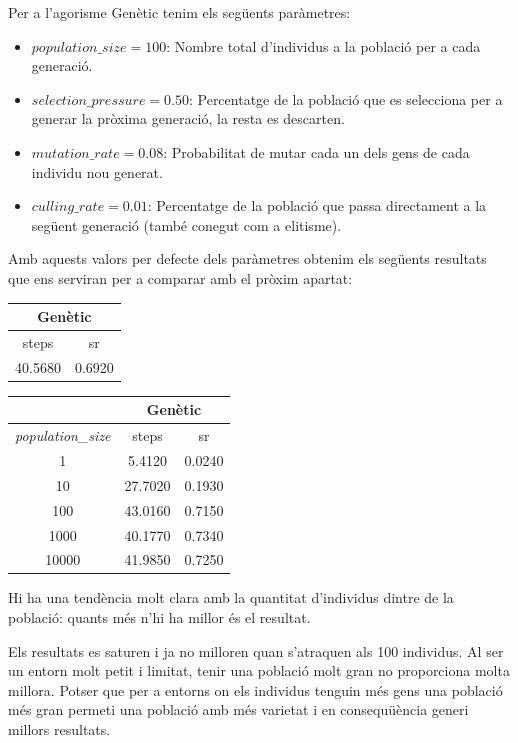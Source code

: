 \documentclass[12pt,a4paper]{report}
\begin{document}
Per a l'agorisme Genètic tenim els següents paràmetres:
\begin{itemize}
  \item $\mathit{population\_size} = 100$: Nombre total d'individus a la població per a cada generació.
  \item $\mathit{selection\_pressure} = 0.50$: Percentatge de la població que es selecciona per a generar
  la pròxima generació, la resta es descarten.
  \item $\mathit{mutation\_rate} = 0.08$: Probabilitat de mutar cada un dels gens de cada individu nou generat.
  \item $\mathit{culling\_rate} = 0.01$: Percentatge de la població que passa directament a la següent generació
  (també conegut com a elitisme).
\end{itemize}

Amb aquests valors per defecte dels paràmetres obtenim els següents resultats que ens serviran per a comparar
amb el pròxim apartat:

\begin{table}[H]
  \centering
  \begin{tabular}{| c c |}
    \hline
    \multicolumn{2}{|c|}{Genètic} \\
    \hline
    steps & sr \\
    \hline
    40.5680 & 0.6920 \\
    \hline
  \end{tabular}
\end{table}

\begin{minipage}{0.3\textwidth}
  \centering
  \begin{tabular}{| c | c c |}
    \hline
      & \multicolumn{2}{|c|}{Genètic} \\
    \hline
    \textit{population\_size} & steps & sr \\
    \hline
    1     &  5.4120 & 0.0240 \\
    10    & 27.7020 & 0.1930 \\
    100   & 43.0160 & 0.7150 \\
    1000  & 40.1770 & 0.7340 \\
    10000 & 41.9850 & 0.7250 \\
    \hline
  \end{tabular}
\end{minipage}
\hfill
\begin{minipage}{0.5\textwidth}
  Hi ha una tendència molt clara amb la quantitat d'individus dintre de la població: quants més n'hi ha
  millor és el resultat.
  
  Els resultats es saturen i ja no milloren quan s'atraquen als 100 individus. Al ser un entorn molt petit i
  limitat, tenir una població molt gran no proporciona molta millora. Potser que per a entorns on els individus
  tenguin més gens una població més gran permeti una població amb més varietat i en consequüència generi millors resultats.
\end{minipage}
\end{document}

